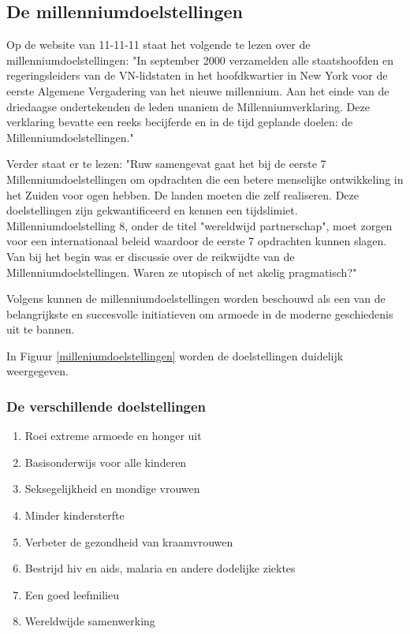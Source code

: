 \subsection{De millenniumdoelstellingen}
Op de website van 11-11-11 staat het volgende te lezen over de millenniumdoelstellingen: "In september 2000 verzamelden alle staatshoofden en regeringsleiders van de VN-lidstaten in het hoofdkwartier in New York voor de eerste Algemene Vergadering van het nieuwe millennium. Aan het einde van de driedaagse ondertekenden de leden unaniem de Millenniumverklaring. Deze verklaring bevatte een reeks becijferde en in de tijd geplande doelen: de Millenniumdoelstellingen." \autocite{11.11.112019}

Verder staat er te lezen: "Ruw samengevat gaat het bij de eerste 7 Millenniumdoelstellingen om opdrachten die een betere menselijke ontwikkeling in het Zuiden voor ogen hebben. De landen moeten die zelf realiseren. Deze doelstellingen zijn gekwantificeerd en kennen een tijdslimiet. Millenniumdoelstelling 8, onder de titel "wereldwijd partnerschap", moet zorgen voor een internationaal beleid waardoor de eerste 7 opdrachten kunnen slagen. Van bij het begin was er discussie over de reikwijdte van de Millenniumdoelstellingen. Waren ze utopisch of net akelig pragmatisch?" \autocite{11.11.112019}

Volgens \autocite{Tjoa2016} kunnen de millenniumdoelstellingen worden beschouwd als een van de belangrijkste en succesvolle initiatieven om armoede in de moderne geschiedenis uit te bannen.

In Figuur \ref{milleniumdoelstellingen} worden de doelstellingen duidelijk weergegeven.

 
 \subsubsection{De verschillende doelstellingen}
 \begin{enumerate}
 \item Roei extreme armoede en honger uit
 \item Basisonderwijs voor alle kinderen
 \item Seksegelijkheid en mondige vrouwen
 \item Minder kindersterfte
 \item Verbeter de gezondheid van kraamvrouwen
 \item Bestrijd hiv en aids, malaria en andere dodelijke ziektes
 \item Een goed leefmilieu 
 \item Wereldwijde samenwerking
\end{enumerate}
\autocite{NOS2015}

